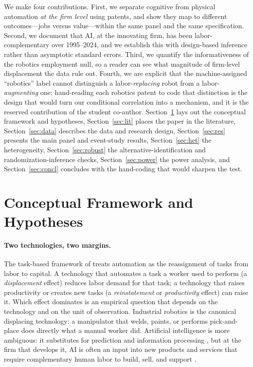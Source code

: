 \documentclass[12pt]{article}
\begin{document}
We make four contributions. First, we separate cognitive from physical automation \emph{at the
firm level} using patents, and show they map to different outcomes---jobs versus value---within
the same panel and the same specification. Second, we document that AI, at the innovating firm,
has been labor-complementary over 1995--2024, and we establish this with design-based inference
rather than asymptotic standard errors. Third, we quantify the informativeness of the robotics
employment null, so a reader can see what magnitude of firm-level displacement the data rule out.
Fourth, we are explicit that the machine-assigned ``robotics'' label cannot distinguish a
labor-\emph{replacing} robot from a labor-\emph{augmenting} one; hand-reading each robotics patent
to code that distinction is the design that would turn our conditional correlation into a
mechanism, and it is the reserved contribution of the student co-author. Section~\ref{sec:bg}
lays out the conceptual framework and hypotheses, Section~\ref{sec:lit} places the paper in the
literature, Section~\ref{sec:data} describes the data and research design, Section~\ref{sec:res}
presents the main panel and event-study results, Section~\ref{sec:het} the heterogeneity,
Section~\ref{sec:robust} the alternative-identification and randomization-inference checks,
Section~\ref{sec:power} the power analysis, and Section~\ref{sec:concl} concludes with the
hand-coding that would sharpen the test.

\section{Conceptual Framework and Hypotheses}\label{sec:bg}
\paragraph{Two technologies, two margins.} The task-based framework of \citet{acemoglu2020,
acemoglu2022} treats automation as the reassignment of tasks from labor to capital. A technology
that automates a task a worker used to perform (a \emph{displacement} effect) reduces labor
demand for that task; a technology that raises productivity or creates new tasks (a
\emph{reinstatement} or \emph{productivity} effect) can raise it. Which effect dominates is an
empirical question that depends on the technology and on the unit of observation. Industrial
robotics is the canonical displacing technology: a manipulator that welds, paints, or performs
pick-and-place does directly what a manual worker did. Artificial intelligence is more ambiguous:
it substitutes for prediction and information processing \citep{autor2015,webb2020}, but at the
firm that develops it, AI is often an input into new products and services that require
complementary human labor to build, sell, and support \citep{babina2024}.
\end{document}

